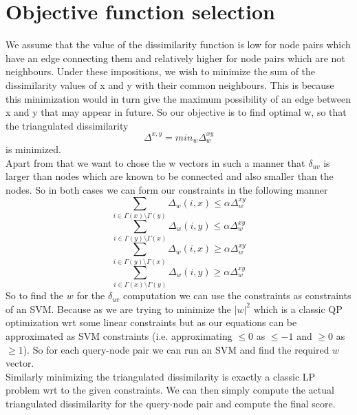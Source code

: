\section*{Objective function selection}
We assume that the value of the dissimilarity function is low for node pairs which have an edge connecting them and relatively higher for node pairs which are not neighbours. Under these impositions, we wish to minimize the sum of the dissimilarity values of x and y with their common neighbours. This is because this minimization would in turn give the maximum possibility of an edge between x and y that may appear in future. So our objective is to find optimal w, so that the triangulated dissimilarity
\begin{equation}
\Delta^{x,y} = min_{w} \Delta_{w}^{xy}
\end{equation}
is minimized.
\\
Apart from that we want to chose the w vectors in such a manner that $\delta_{uv}$ is larger than nodes which are known to be connected and also smaller than the nodes. So in both cases we can form our constraints in the following manner
\begin{equation}
\sum_{i \in \Gamma(x) \setminus \Gamma(y)} \Delta_{w} (i,x) \leq \alpha \Delta_{w}^{xy}
\end{equation}
\begin{equation}
\sum_{i \in \Gamma(y) \setminus \Gamma(x)} \Delta_{w} (i,y) \leq \alpha \Delta_{w}^{xy}
\end{equation}
\begin{equation}
\sum_{i \in \Gamma(y) \setminus \Gamma(x)} \Delta_{w} (i,x) \geq \alpha \Delta_{w}^{xy}
\end{equation}
\begin{equation}
\sum_{i \in \Gamma(x) \setminus \Gamma(y)} \Delta_{w} (i,y) \geq \alpha \Delta_{w}^{xy}
\end{equation}
So to find the $w$ for the $\delta_{uv}$ computation we can use the constraints as constraints of an SVM. Because as we are trying to minimize the $|w|^2$ which is a classic QP optimization wrt some linear constraints but as our equations can be approximated as SVM constraints (i.e. approximating $ \leq 0$ as $\leq -1$ and $\geq 0$ as $\geq 1$). So for each query-node pair we can run an SVM and find the required $w$ vector.
\\
Similarly minimizing the triangulated dissimilarity is exactly a classic LP problem wrt to the given constraints. We can then simply compute the actual triangulated dissimilarity for the query-node pair and compute the final score.



